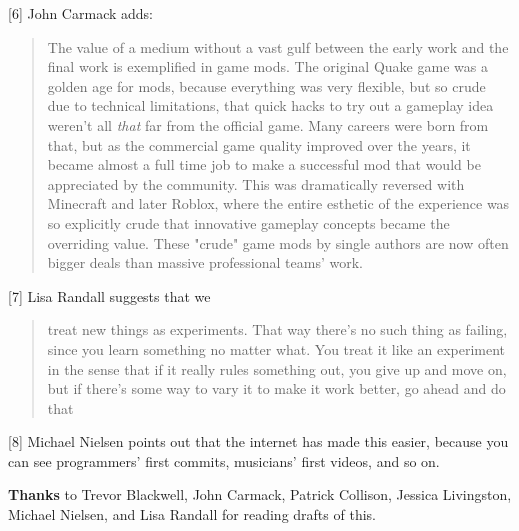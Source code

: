 [6] John Carmack adds:
                  \begin{quote}

                    The value of a medium without a vast gulf between the early
                    work and the final work is exemplified in game mods. The
                    original Quake game was a golden age for mods, because
                    everything was very flexible, but so crude due to technical
                    limitations, that quick hacks to try out a gameplay idea
                    weren't all \emph{that} far from the official game. Many
                    careers were born from that, but as the commercial game
                    quality improved over the years, it became almost a full
                    time job to make a successful mod that would be appreciated
                    by the community. This was dramatically reversed with
                    Minecraft and later Roblox, where the entire esthetic of the
                    experience was so explicitly crude that innovative gameplay
                    concepts became the overriding value. These "crude" game
                    mods by single authors are now often bigger deals than
                    massive professional teams' work.
                  
\end{quote}

                  [7] Lisa Randall suggests that we
                  \begin{quote}

                    treat new things as experiments. That way there's no such
                    thing as failing, since you learn something no matter what.
                    You treat it like an experiment in the sense that if it
                    really rules something out, you give up and move on, but if
                    there's some way to vary it to make it work better, go ahead
                    and do that
                  
\end{quote}

                  [8] Michael Nielsen points out that the internet has made this
                  easier, because you can see programmers' first commits,
                  musicians' first videos, and so on.



\textbf{Thanks}
                  to Trevor Blackwell, John Carmack, Patrick Collison, Jessica
                  Livingston, Michael Nielsen, and Lisa Randall for reading
                  drafts of this.


              
            
          
            
              
                


                  
              
            
          
